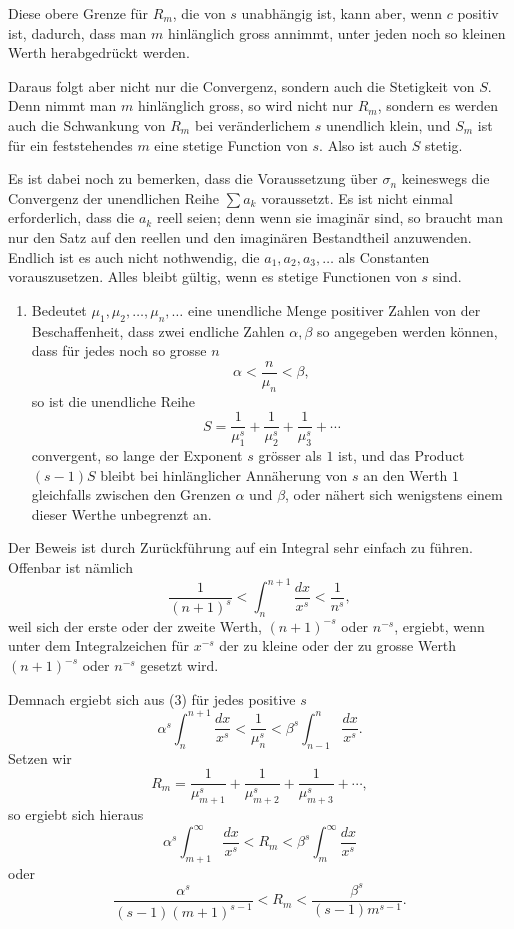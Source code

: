 \documentclass[11pt]{article}
\begin{document}
Diese obere Grenze für $R_m$, die von $s$ unabhängig ist, kann aber, wenn $c$ positiv ist, dadurch, dass man $m$ hinlänglich gross annimmt, unter jeden noch so kleinen Werth herabgedrückt werden.

Daraus folgt aber nicht nur die Convergenz, sondern auch die Stetigkeit von $S$. Denn nimmt man $m$ hinlänglich gross, so wird nicht nur $R_m$, sondern es werden auch die Schwankung von $R_m$ bei veränderlichem $s$ unendlich klein, und $S_m$ ist für ein feststehendes $m$ eine stetige Function von $s$. Also ist auch $S$ stetig.

Es ist dabei noch zu bemerken, dass die Voraussetzung über $\sigma_n$ keineswegs die Convergenz der unendlichen Reihe $\sum a_k$ voraussetzt. Es ist nicht einmal erforderlich, dass die $a_k$ reell seien; denn wenn sie imaginär sind, so braucht man nur den Satz auf den reellen und den imaginären Bestandtheil anzuwenden. Endlich ist es auch nicht nothwendig, die $a_1,a_2,a_3,\ldots$ als Constanten vorauszusetzen. Alles bleibt gültig, wenn es stetige Functionen von $s$ sind.

\begin{enumerate}[label=\textbf{\arabic*.},leftmargin=2.2em,start=2]
\item Bedeutet $\mu_1,\mu_2,\ldots,\mu_n,\ldots$ eine unendliche Menge positiver Zahlen von der Beschaffenheit, dass zwei endliche Zahlen $\alpha,\beta$ so angegeben werden können, dass für jedes noch so grosse $n$
\begin{equation}
\alpha<\frac{n}{\mu_n}<\beta,
\tag{3}
\end{equation}
so ist die unendliche Reihe
\[
S=\frac1{\mu_1^s}+\frac1{\mu_2^s}+\frac1{\mu_3^s}+\cdots
\]
convergent, so lange der Exponent $s$ grösser als $1$ ist, und das Product $(s-1)S$ bleibt bei hinlänglicher Annäherung von $s$ an den Werth $1$ gleichfalls zwischen den Grenzen $\alpha$ und $\beta$, oder nähert sich wenigstens einem dieser Werthe unbegrenzt an.
\end{enumerate}

Der Beweis ist durch Zurückführung auf ein Integral sehr einfach zu führen. Offenbar ist nämlich
\[
\frac1{(n+1)^s}<\int_n^{n+1}\frac{dx}{x^s}<\frac1{n^s},
\]
weil sich der erste oder der zweite Werth, $(n+1)^{-s}$ oder $n^{-s}$, ergiebt, wenn unter dem Integralzeichen für $x^{-s}$ der zu kleine oder der zu grosse Werth $(n+1)^{-s}$ oder $n^{-s}$ gesetzt wird.

Demnach ergiebt sich aus (3) für jedes positive $s$
\[
\alpha^s\int_n^{n+1}\frac{dx}{x^s}<\frac1{\mu_n^s}<\beta^s\int_{n-1}^{n}\frac{dx}{x^s}.
\]
Setzen wir
\[
R_m=\frac1{\mu_{m+1}^s}+\frac1{\mu_{m+2}^s}+\frac1{\mu_{m+3}^s}+\cdots,
\]
so ergiebt sich hieraus
\[
\alpha^s\int_{m+1}^{\infty}\frac{dx}{x^s}<R_m<\beta^s\int_m^{\infty}\frac{dx}{x^s}
\]
oder
\begin{equation}
\frac{\alpha^s}{(s-1)(m+1)^{s-1}}<R_m<\frac{\beta^s}{(s-1)m^{s-1}} .
\tag{4}
\end{equation}
\end{document}
